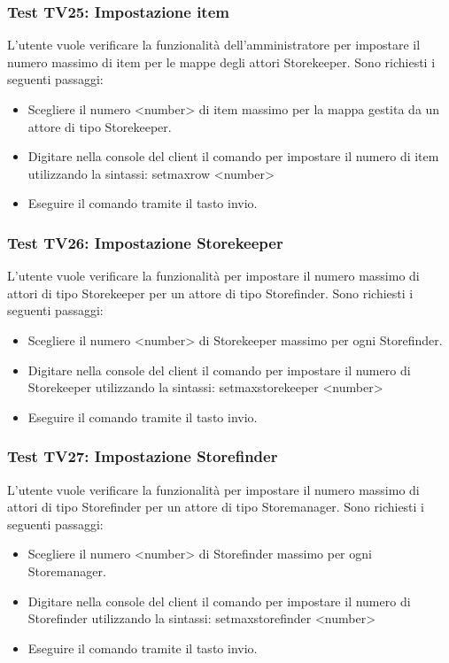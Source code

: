 \documentclass[a4paper]{article}
\begin{document}
		\subsubsection{Test TV25: Impostazione item}
		L'utente vuole verificare la funzionalità dell'amministratore per impostare il numero massimo di item per le mappe degli attori Storekeeper.
		Sono richiesti i seguenti passaggi:
		\begin{itemize}
			\item Scegliere il numero <number> di item massimo per la mappa gestita da un attore di tipo Storekeeper.
			\item Digitare nella console del client il comando per impostare il numero di item utilizzando la sintassi: setmaxrow <number>
			\item Eseguire il comando tramite il tasto invio.
		\end{itemize}
		
		\subsubsection{Test TV26: Impostazione Storekeeper}
		L'utente vuole verificare la funzionalità per impostare il numero massimo di attori di tipo Storekeeper per un attore di tipo Storefinder.
		Sono richiesti i seguenti passaggi:
		\begin{itemize}
			\item Scegliere il numero <number> di Storekeeper massimo per ogni Storefinder.
			\item Digitare nella console del client il comando per impostare il numero di Storekeeper utilizzando la sintassi: setmaxstorekeeper <number>
			\item Eseguire il comando tramite il tasto invio.
		\end{itemize}
		
		\subsubsection{Test TV27: Impostazione Storefinder}
		L'utente vuole verificare la funzionalità per impostare il numero massimo di attori di tipo Storefinder per un attore di tipo Storemanager.
		Sono richiesti i seguenti passaggi:
		\begin{itemize}
			\item Scegliere il numero <number> di Storefinder massimo per ogni Storemanager.
			\item Digitare nella console del client il comando per impostare il numero di Storefinder utilizzando la sintassi: setmaxstorefinder <number>
			\item Eseguire il comando tramite il tasto invio.
		\end{itemize}
\end{document}
